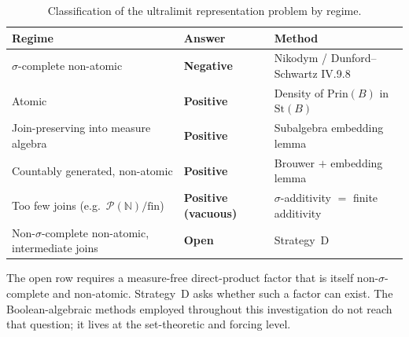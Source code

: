 \documentclass[11pt]{article}
\theoremstyle{definition}
\theoremstyle{remark}
\newcommand{\N}{\mathbb{N}}
\newcommand{\St}{\mathrm{St}}
\newcommand{\Prin}{\mathrm{Prin}}
\begin{document}
\begin{table}[h]
\centering
\begin{tabular}{@{}lll@{}}
\toprule
Regime & Answer & Method \\
\midrule
$\sigma$-complete non-atomic & \textbf{Negative} & Nikodym / Dunford--Schwartz IV.9.8 \\
Atomic & \textbf{Positive} & Density of $\Prin(B)$ in $\St(B)$ \\
Join-preserving into measure algebra & \textbf{Positive} & Subalgebra embedding lemma \\
Countably generated, non-atomic & \textbf{Positive} & Brouwer $+$ embedding lemma \\
Too few joins (e.g.\ $\mathcal{P}(\N)/\mathrm{fin}$) & \textbf{Positive (vacuous)} & $\sigma$-additivity $=$ finite additivity \\
Non-$\sigma$-complete non-atomic, intermediate joins & \textbf{Open} & Strategy~D \\
\bottomrule
\end{tabular}
\caption{Classification of the ultralimit representation problem by regime.}
\end{table}

The open row requires a measure-free direct-product factor that is itself
non-$\sigma$-complete and non-atomic. Strategy~D asks whether such a factor
can exist. The Boolean-algebraic methods employed throughout this investigation
do not reach that question; it lives at the set-theoretic and forcing level.




\end{document}
